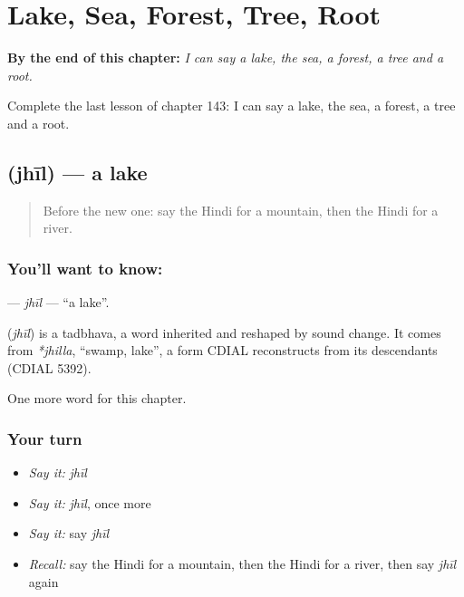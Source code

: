
\chapter{Lake, Sea, Forest, Tree, Root}
\label{ch:hi-lake-sea-forest-tree-root}

\begin{chapteropening}
\textbf{By the end of this chapter:} \emph{I can say a lake, the sea, a forest, a tree and a root.}

Complete the last lesson of chapter 143: I can say a lake, the sea, a forest, a tree and a root.
\end{chapteropening}

\section[\texorpdfstring{\hi{झील} (jhīl)}{झील (jhīl)}]{ (jhīl) — a lake}

\label{lesson:HI-C143-jhil}



\begin{quote}
Before the new one: say the Hindi for a mountain, then the Hindi for a river.
\end{quote}

\subsection*{You'll want to know: }
\textbf{} — \emph{jhīl} — \textquotedblleft{}a lake\textquotedblright{}.

\begin{cousinweb}
\textbf{} (\emph{jhīl}) is a tadbhava, a word inherited and reshaped by sound change. It comes from \emph{*jhilla}, \textquotedblleft{}swamp, lake\textquotedblright{}, a form CDIAL reconstructs from its descendants (CDIAL 5392).
\end{cousinweb}

\begin{grammarlens}[title={What you've built}]
One more word for this chapter.
\end{grammarlens}

\subsection*{Your turn}
\begin{itemize}
\raggedright
  \item \emph{Say it:} \emph{jhīl}
  \item \emph{Say it:} \emph{jhīl}, once more
  \item \emph{Say it:} say \emph{jhīl}
  \item \emph{Recall:} say the Hindi for a mountain, then the Hindi for a river, then say \emph{jhīl} again
\end{itemize}


